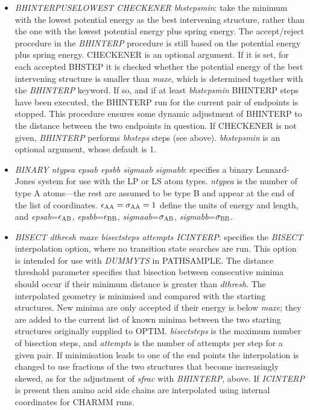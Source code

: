 \documentclass[12pt,a4paper,dvips]{article}
\begin{document}
\begin{itemize}
\item {\it BHINTERPUSELOWEST\/ CHECKENER bhstepsmin}: take the minimum with the lowest potential energy
as the best intervening structure, rather than the one with the lowest potential energy
plus spring energy. The accept/reject procedure in the {\it BHINTERP\/} procedure
is still based on the potential energy plus spring energy.
CHECKENER is an optional argument. If it is set, for each accepted BHSTEP it is checked whether
the potential energy of the best intervening structure is smaller than {\it maxe}, which
is determined together with the {\it BHINTERP} keyword.  
If so, and if at least {\it bhstepsmin} BHINTERP steps have been executed,
the BHINTERP run for the current pair of endpoints is stopped.
This procedure ensures some dynamic adjustment of BHINTERP to the distance between the 
two endpoints in question. If CHECKENER is not given, {\it BHINTERP} performs
{\it bhsteps} steps (see above). {\it bhstepsmin} is an optional argument, whose default is 1. 

\item {\it BINARY ntypea epsab epsbb sigmaab sigmabb\/}: specifies a binary Lennard-Jones
system for use with the LP or LS atom types. {\it ntypea\/} is the number of type
A atoms---the rest are assumed to be type B and appear at the end of the list
of coordinates. $\epsilon_{\rm AA}=\sigma_{\rm AA}=1$ define the units of energy and length,
and {\it epsab\/}=$\epsilon_{\rm AB}$, {\it epsbb\/}=$\epsilon_{\rm BB}$,
{\it sigmaab\/}=$\sigma_{\rm AB}$, {\it sigmabb\/}=$\sigma_{\rm BB}$.

\item {\it BISECT dthresh maxe bisectsteps attempts ICINTERP\/}: specifies 
the {\it BISECT} interpolation option,
where no transition state searches are run. 
This option is intended for use with {\it DUMMYTS} in PATHSAMPLE.
The distance threshold parameter specifies that bisection between consecutive minima
should occur if their minimum distance is greater than {\it dthresh}.
The interpolated geometry is minimised and compared with the starting structures.
New minima are only accepted if their energy is below {\it maxe}; they are added to the
current list of known minima between the two starting structures originally supplied to OPTIM. 
{\it bisectsteps\/} is the maximum number of bisection steps, and
{\it attempts} is the number of attempts per step for a given pair.
If minimisation leads to one of the end points the interpolation is changed to use
fractions of the two structures that become increasingly skewed, as for
the adjustment of {\it sfrac\/} with {\it BHINTERP\/}, above.
If {\it ICINTERP\/} is present then amino acid side chains are interpolated using
internal coordinates for CHARMM runs.


\end{itemize}
\end{document}
